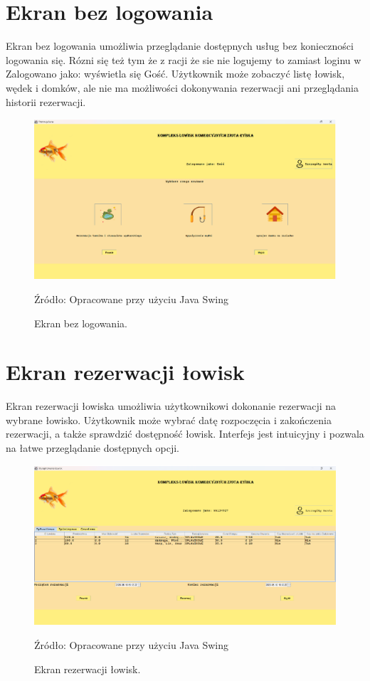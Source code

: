 \section{Ekran bez logowania}
Ekran bez logowania umożliwia przeglądanie dostępnych usług bez konieczności logowania się. Rózni się też tym że z racji że sie nie logujemy to zamiast loginu w Zalogowano jako: wyświetla się Gość. Użytkownik może zobaczyć listę łowisk, wędek i domków, ale nie ma możliwości dokonywania rezerwacji ani przeglądania historii rezerwacji.
\begin{figure}[H]
    \centering
    \includegraphics[width=0.8\linewidth]{figures/without.eps}
    \caption{Ekran bez logowania.}
    \label{fig:without_login_screen}
    \small{Źródło: Opracowane przy użyciu Java Swing}
\end{figure}
\clearpage

\section{Ekran rezerwacji łowisk}
Ekran rezerwacji łowiska umożliwia użytkownikowi dokonanie rezerwacji na wybrane łowisko. Użytkownik może wybrać datę rozpoczęcia i zakończenia rezerwacji, a także sprawdzić dostępność łowisk. Interfejs jest intuicyjny i pozwala na łatwe przeglądanie dostępnych opcji.
\begin{figure}[H]
    \centering
    \includegraphics[width=0.8\linewidth]{figures/lakes.eps}
    \caption{Ekran rezerwacji łowisk.}
    \label{fig:lakes_screen}
    \small{Źródło: Opracowane przy użyciu Java Swing}
\end{figure}
\clearpage

